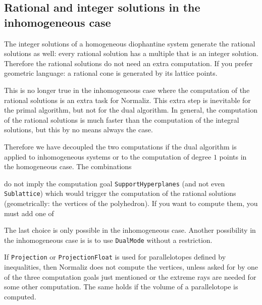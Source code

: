 \subsection{Rational and integer solutions in the inhomogeneous case}\label{InhomDual}

The integer solutions of a homogeneous diophantine system generate the rational solutions as well: every rational solution has a multiple that is an integer solution. Therefore the rational solutions do not need an extra computation. If you prefer geometric language: a rational cone is generated by its lattice points.

This is no longer true in the inhomogeneous case where the computation of the rational solutions is an extra task for Normaliz. This extra step is inevitable for the primal algorithm, but not for the dual algorithm. In general, the computation of the rational solutions is much faster than the computation of the integral solutions, but this by no means always the case.

Therefore we have decoupled the two computations if the dual algorithm is applied to inhomogeneous systems or to the computation of degree $1$ points in the homogeneous case. The combinations
\begin{itemize}
	
	
	
	
\end{itemize}
do not imply the computation goal \verb|SupportHyperplanes| (and not even \verb|Sublattice|) which would trigger the computation of the rational solutions (geometrically: the vertices of the polyhedron). If you want to compute them, you must add one of
\begin{itemize}
	\itemtt[SupportHyperplanes, -s]
	
	\itemtt[ExtremeRays]
	
	\itemtt[VerticesOfPolyhedron]
\end{itemize}
The last choice is only possible in the inhomogeneous case. Another possibility in the inhomogeneous case is is to use \verb|DualMode| without a restriction.

If \verb|Projection| or \verb|ProjectionFloat| is used for parallelotopes defined by inequalities, then Normaliz does not compute the vertices, unless asked for by one of the three computation goals just mentioned or the extreme rays are needed for some other computation. The same holds if the volume of a parallelotope is computed.
